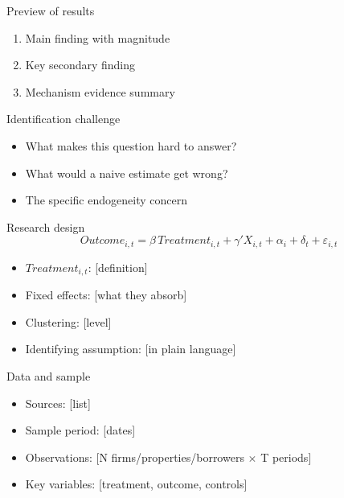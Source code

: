\documentclass[aspectratio=169,11pt]{beamer}
\begin{document}
\begin{frame}{Preview of results}
\begin{enumerate}
    \item Main finding with magnitude
    \item Key secondary finding
    \item Mechanism evidence summary
\end{enumerate}
\end{frame}

\begin{frame}{Identification challenge}
\begin{itemize}
    \item What makes this question hard to answer?
    \item What would a naive estimate get wrong?
    \item The specific endogeneity concern
\end{itemize}
\end{frame}

\begin{frame}{Research design}
\begin{equation*}
    \textit{Outcome}_{i,t} = \beta \, \textit{Treatment}_{i,t} + \gamma' X_{i,t} + \alpha_i + \delta_t + \varepsilon_{i,t}
\end{equation*}
\vspace{0.5cm}
\begin{itemize}
    \item $\textit{Treatment}_{i,t}$: [definition]
    \item Fixed effects: [what they absorb]
    \item Clustering: [level]
    \item Identifying assumption: [in plain language]
\end{itemize}
\end{frame}

\begin{frame}{Data and sample}
\begin{itemize}
    \item Sources: [list]
    \item Sample period: [dates]
    \item Observations: [N firms/properties/borrowers $\times$ T periods]
    \item Key variables: [treatment, outcome, controls]
\end{itemize}
\end{frame}
\end{document}
